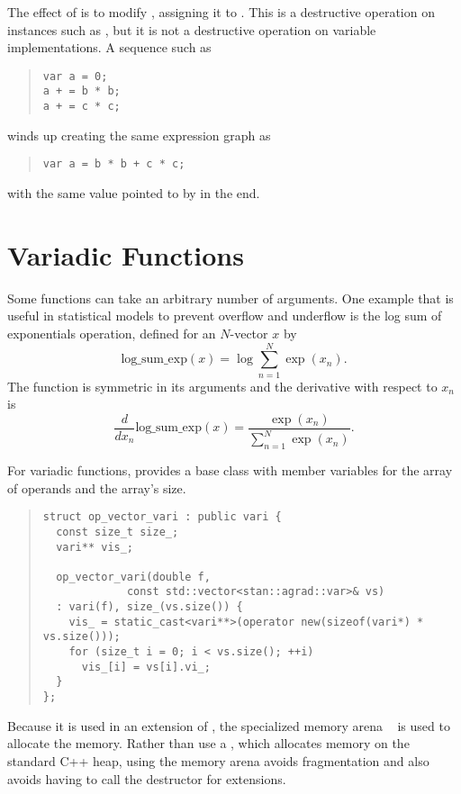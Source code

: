 \documentclass[10pt]{article}
\begin{document}
The effect of  is to modify , assigning it to
.  This is a destructive operation on  instances
such as , but it is not a destructive operation on variable
implementations.  A sequence such as 
%
\begin{quote}
\begin{Verbatim}
var a = 0;
a + = b * b;
a + = c * c;
\end{Verbatim}
\end{quote}
%
winds up creating the same expression graph as
%
\begin{quote}
\begin{Verbatim}
var a = b * b + c * c;
\end{Verbatim}
\end{quote}
%
with the same value pointed to by  in the end.


\section{Variadic Functions}\label{variadic-functions.section}

Some functions can take an arbitrary number of arguments.  One example
that is useful in statistical models to prevent overflow and underflow
is the log sum of exponentials operation, defined for an $N$-vector
$x$ by
%
\[
\mbox{log\_sum\_exp}(x) 
= \log \sum_{n=1}^N \exp(x_n).
\]
%
The function is symmetric in its arguments and the derivative with
respect to $x_n$ is
\[
\frac{d}{d x_n} \mbox{log\_sum\_exp}(x)
= \frac{\exp(x_n)}{\sum_{n=1}^N \exp(x_n)}.
\]

For variadic functions,  provides a base class
with member variables for the array of operands and the array's size.
%
\begin{quote}
\begin{Verbatim}
struct op_vector_vari : public vari {
  const size_t size_;
  vari** vis_;

  op_vector_vari(double f, 
             const std::vector<stan::agrad::var>& vs) 
  : vari(f), size_(vs.size()) {
    vis_ = static_cast<vari**>(operator new(sizeof(vari*) * vs.size())); 
    for (size_t i = 0; i < vs.size(); ++i)
      vis_[i] = vs[i].vi_;
  }
};
\end{Verbatim}
\end{quote}
%
Because it is used in an extension of , the specialized
memory arena ~ is used to allocate the
memory.  Rather than use a , which allocates memory
on the standard C++ heap, using the memory arena avoids fragmentation
and also avoids having to call the destructor for  extensions.
\end{document}
